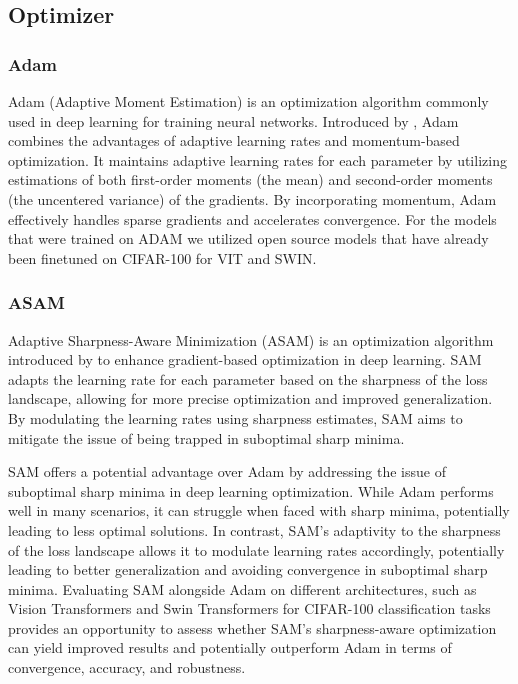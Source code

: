\documentclass{article}
\begin{document}
\subsection{Optimizer}

\subsubsection{Adam}
Adam (Adaptive Moment Estimation) is an optimization algorithm commonly used in deep learning for training neural networks.
Introduced by \cite{Kingma2014AdamAM}, Adam combines the advantages of adaptive learning rates and momentum-based optimization.
It maintains adaptive learning rates for each parameter by utilizing estimations of both first-order moments (the mean) and second-order moments (the uncentered variance) of the gradients.
By incorporating momentum, Adam effectively handles sparse gradients and accelerates convergence.
For the models that were trained on ADAM we utilized open source models that have already been finetuned on CIFAR-100 for VIT and SWIN.

\subsubsection{ASAM}
Adaptive Sharpness-Aware Minimization (ASAM) is an optimization algorithm introduced by \cite{DBLP:journals/corr/abs-2102-11600} to enhance gradient-based optimization in deep learning.
SAM adapts the learning rate for each parameter based on the sharpness of the loss landscape, allowing for more precise optimization and improved generalization.
By modulating the learning rates using sharpness estimates, SAM aims to mitigate the issue of being trapped in suboptimal sharp minima.

SAM offers a potential advantage over Adam by addressing the issue of suboptimal sharp minima in deep learning optimization.
While Adam performs well in many scenarios, it can struggle when faced with sharp minima, potentially leading to less optimal solutions.
In contrast, SAM's adaptivity to the sharpness of the loss landscape allows it to modulate learning rates accordingly, potentially leading to better generalization and avoiding convergence in suboptimal sharp minima.
Evaluating SAM alongside Adam on different architectures, such as Vision Transformers and Swin Transformers for CIFAR-100 classification tasks provides an opportunity to assess whether SAM's sharpness-aware optimization can yield improved results and potentially outperform Adam in terms of convergence, accuracy, and robustness.
\end{document}
